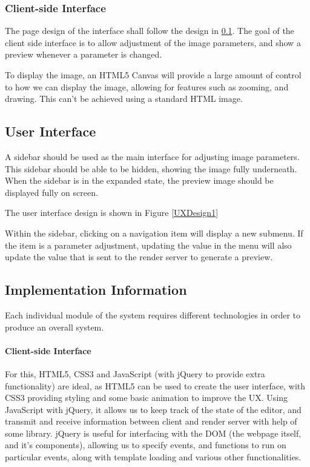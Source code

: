 \documentclass[12pt,a4paper]{article}
\begin{document}

\subsubsection{Client-side Interface}
  The page design of the interface shall follow the design in \ref{UserInterface}.
  The goal of the client side interface is to allow adjustment of the image parameters,
  and show a preview whenever a parameter is changed.

  To display the image, an HTML5 Canvas will provide a large amount of control to
  how we can display the image, allowing for features such as zooming, and drawing. This can't be
  achieved using a standard HTML image.

\subsection{User Interface}\label{UserInterface}
  A sidebar should be used as the main interface for adjusting image parameters.
  This sidebar should be able to be hidden, showing the image fully underneath.
  When the sidebar is in the expanded state, the preview image should be displayed
  fully on screen.

  The user interface design is shown in Figure \ref{UXDesign1}

  Within the sidebar, clicking on a navigation item will display a new submenu.
  If the item is a parameter adjustment, updating the value in the menu will also
  update the value that is sent to the render server to generate a preview.
%

\subsection{Implementation Information}
Each individual module of the system requires different technologies in order to
produce an overall system.

\paragraph{Client-side Interface}
For this, HTML5, CSS3 and JavaScript (with jQuery to provide extra functionality)
are ideal, as HTML5 can be used to create the user interface, with CSS3 providing styling
and some basic animation to improve the UX. Using JavaScript with jQuery, it allows us
to keep track of the state of the editor, and transmit and receive information between client and
render server with help of some library. jQuery is useful for interfacing with the
DOM (the webpage itself, and it's components), allowing us to specify events, and functions
to run on particular events, along with template loading and various other functionalities.
\end{document}
